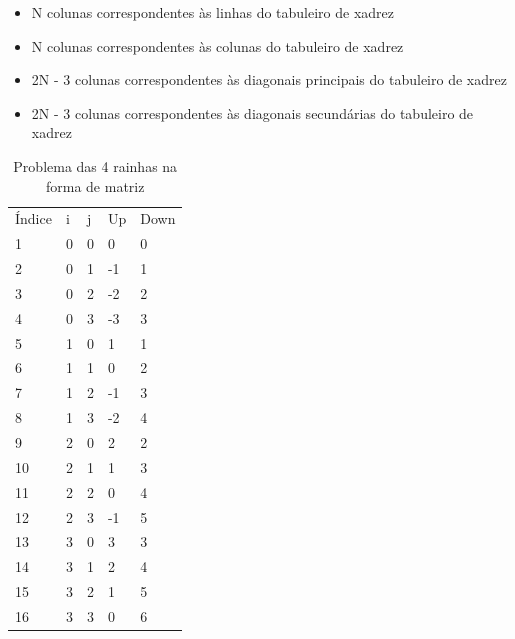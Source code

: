 \documentclass{article}
\begin{document}
\begin{itemize}
\item N colunas correspondentes às linhas do tabuleiro de xadrez
\item N colunas correspondentes às colunas do tabuleiro de xadrez
\item 2N - 3 colunas correspondentes às diagonais principais do tabuleiro de xadrez
\item 2N - 3 colunas correspondentes às diagonais secundárias do tabuleiro de xadrez
\end{itemize}

\begin{center}
  \begin{table}
  \centering
  \begin{tabular}{ l l l l l }
    Índice & i & j & Up & Down  \\
    1 & 0 & 0 & 0   & 0    \\
    2 & 0 & 1 & -1  & 1    \\
    3 & 0 & 2 & -2  & 2    \\
    4 & 0 & 3 & -3  & 3    \\
    5 & 1 & 0 & 1   & 1    \\
    6 & 1 & 1 & 0   & 2    \\
    7 & 1 & 2 & -1  & 3    \\
    8 & 1 & 3 & -2  & 4    \\
    9 & 2 & 0 & 2   & 2    \\
    10 & 2 & 1 & 1   & 3    \\
    11 & 2 & 2 & 0   & 4    \\
    12 & 2 & 3 & -1  & 5    \\
    13 & 3 & 0 & 3   & 3    \\
    14 & 3 & 1 & 2   & 4    \\
    15 & 3 & 2 & 1   & 5    \\
    16 & 3 & 3 & 0   & 6    \\
  \end{tabular}
  \caption{Problema das 4 rainhas na forma de matriz}
  \label{tab:matrix_3_queens}
  \end{table}
\end{center}
\end{document}
